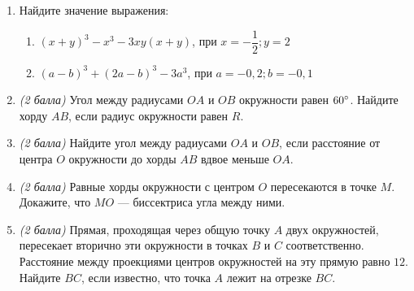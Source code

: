 \documentclass[12pt, a4paper]{article}
\begin{document}
	
	\begin{enumerate}
		\item Найдите значение выражения: 
		\begin{enumerate}[label=\asbuk*)]
			\item $(x+y)^3-x^3-3xy(x+y)$, при $x=-\dfrac{1}{2}; y=2$
			\item $(a-b)^3+(2a-b)^3-3a^3$, при $a=-0,2; b=-0,1$
		\end{enumerate}	
		\item \textit{(2 балла)} Угол между радиусами $OA$ и $OB$ окружности равен $60\degree$. Найдите хорду $AB$, если радиус окружности равен $R$.
		\item \textit{(2 балла)} Найдите угол между радиусами $OA$ и $OB$, если расстояние от центра $O$ окружности до хорды $AB$ вдвое меньше $OA$.
		\item \textit{(2 балла)} Равные хорды окружности с центром $O$ пересекаются в точке $M$. Докажите, что $MO$ — биссектриса угла между ними.
		\item \textit{(2 балла)} Прямая, проходящая через общую точку $A$ двух окружностей, пересекает вторично эти окружности в точках $B$ и $C$ соответственно. Расстояние между проекциями центров окружностей на эту прямую равно $12$. Найдите $BC$, если известно, что точка $A$ лежит на отрезке $BC$.

	\end{enumerate}
\end{document}

